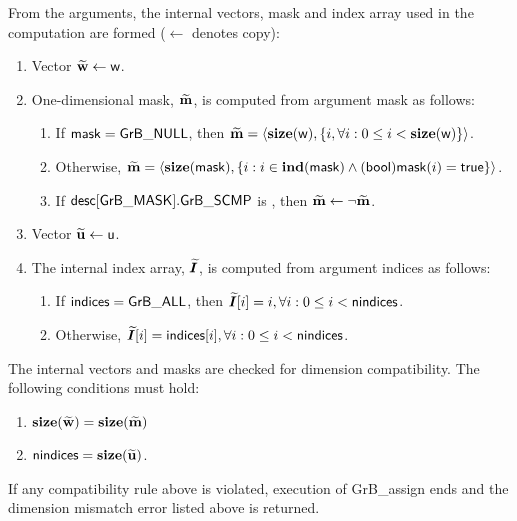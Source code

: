 From the arguments, the internal vectors, mask and index array used in 
the computation are formed ($\leftarrow$ denotes copy):
\begin{enumerate}
	\item Vector ${\bf \widetilde{w}} \leftarrow {\sf w}$.

	\item One-dimensional mask, ${\bf \widetilde{m}}$, is computed from 
    argument {\sf mask} as follows:
	\begin{enumerate}
		\item	If ${\sf mask} = {\sf GrB\_NULL}$, then ${\bf \widetilde{m}} = 
        \langle \bold{size}({\sf w}), \{i, \forall i : 0 \leq i < 
        \bold{size}({\sf w}) \} \rangle$.

		\item	Otherwise, ${\bf \widetilde{m}} = 
        \langle \bold{size}({\sf mask}), \{i : i \in \bold{ind}({\sf mask}) \wedge
        ({\sf bool}){\sf mask}(i) = {\sf true} \} \rangle$.

		\item	If ${\sf desc[GrB\_MASK].GrB\_SCMP}$ is \true, then 
        ${\bf \widetilde{m}} \leftarrow \neg {\bf \widetilde{m}}$.
	\end{enumerate}

	\item Vector ${\bf \widetilde{u}} \leftarrow {\sf u}$.
    
    \item The internal index array, $\bm{\widetilde{I}}$, is computed from 
    argument {\sf indices} as follows:
	\begin{enumerate}
		\item	If ${\sf indices} = {\sf GrB\_ALL}$, then 
        $\bm{\widetilde{I}}[i] = i, \forall i : 0 \leq i < {\sf nindices}$.

		\item	Otherwise, $\bm{\widetilde{I}}[i] = {\sf indices}[i], 
        \forall i : 0 \leq i < {\sf nindices}$.
    \end{enumerate}
\end{enumerate}

The internal vectors and masks are checked for dimension compatibility. 
The following conditions must hold:
\begin{enumerate}
	\item $\bold{size}({\bf \widetilde{w}}) = \bold{size}({\bf \widetilde{m}})$
    \item ${\sf nindices} = \bold{size}({\bf \widetilde{u}})$.
\end{enumerate}
If any compatibility rule above is violated, execution of {\sf GrB\_assign} ends and 
the dimension mismatch error listed above is returned.

